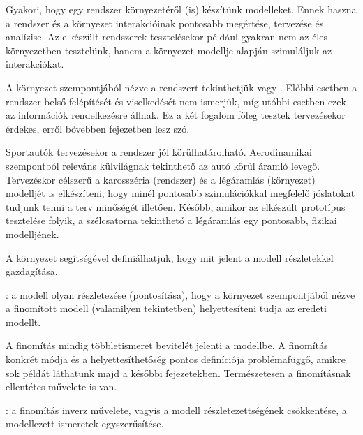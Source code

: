 \begin{megjegyzes}
	Gyakori, hogy egy rendszer környezetéről (is) készítünk modelleket. Ennek haszna a rendszer és a környezet interakcióinak pontosabb megértése, tervezése és analízise. Az elkészült rendszerek tesztelésekor például gyakran nem az éles környezetben tesztelünk, hanem a környezet modellje alapján szimuláljuk az interakciókat.
	
	A környezet szempontjából nézve a rendszert tekinthetjük  vagy . Előbbi esetben a rendszer belső felépítését és viselkedését nem ismerjük, míg utóbbi esetben ezek az információk rendelkezésre állnak. Ez a két fogalom főleg tesztek tervezésekor érdekes, erről bővebben  fejezetben lesz szó.
\end{megjegyzes}

\begin{pelda}
	Sportautók tervezésekor a rendszer jól körülhatárolható. Aerodinamikai szempontból releváns külvilágnak tekinthető az autó körül áramló levegő. Tervezéskor célszerű a karosszéria (rendszer) és a légáramlás (környezet) modelljét is elkészíteni, hogy minél pontosabb szimulációkkal megfelelő jóslatokat tudjunk tenni a terv minőségét illetően. Később, amikor az elkészült prototípus tesztelése folyik, a szélcsatorna tekinthető a légáramlás egy pontosabb, fizikai modelljének.
\end{pelda}

A környezet segítségével definiálhatjuk, hogy mit jelent a modell részletekkel gazdagítása.

\begin{definicio}
	: a modell olyan részletezése (pontosítása), hogy a környezet szempontjából nézve a finomított modell (valamilyen tekintetben) helyettesíteni tudja az eredeti modellt.
\end{definicio}

A finomítás mindig többletismeret bevitelét jelenti a modellbe. A finomítás konkrét módja és a helyettesíthetőség pontos definíciója problémafüggő, amikre sok példát láthatunk majd a későbbi fejezetekben. Természetesen a finomításnak ellentétes művelete is van.

\begin{definicio}
	: a finomítás inverz művelete, vagyis a modell részletezettségének csökkentése, a modellezett ismeretek egyszerűsítése.
\end{definicio}

